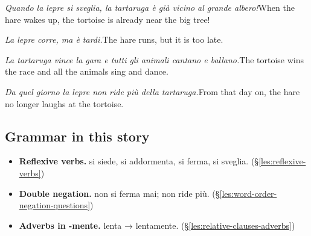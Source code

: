 \documentclass[11pt,a4paper,twoside,openright]{book}
\begin{document}
\begin{sentences}
\item\relax \textit{Quando la lepre si sveglia, la tartaruga è già vicino al grande albero!}\newline When the hare wakes up, the tortoise is already near the big tree!
\item\relax \textit{La lepre corre, ma è tardi.}\newline The hare runs, but it is too late.
\item\relax \textit{La tartaruga vince la gara e tutti gli animali cantano e ballano.}\newline The tortoise wins the race and all the animals sing and dance.
\item\relax \textit{Da quel giorno la lepre non ride più della tartaruga.}\newline From that day on, the hare no longer laughs at the tortoise.
\end{sentences}
\subsection*{Grammar in this story}
\begin{itemize}
\item\relax \textbf{Reflexive verbs.} si siede, si addormenta, si ferma, si sveglia. (\S\ref{les:reflexive-verbs})
\item\relax \textbf{Double negation.} non si ferma mai; non ride più. (\S\ref{les:word-order-negation-questions})
\item\relax \textbf{Adverbs in -mente.} lenta → lentamente. (\S\ref{les:relative-clauses-adverbs})
\end{itemize}
\end{document}
